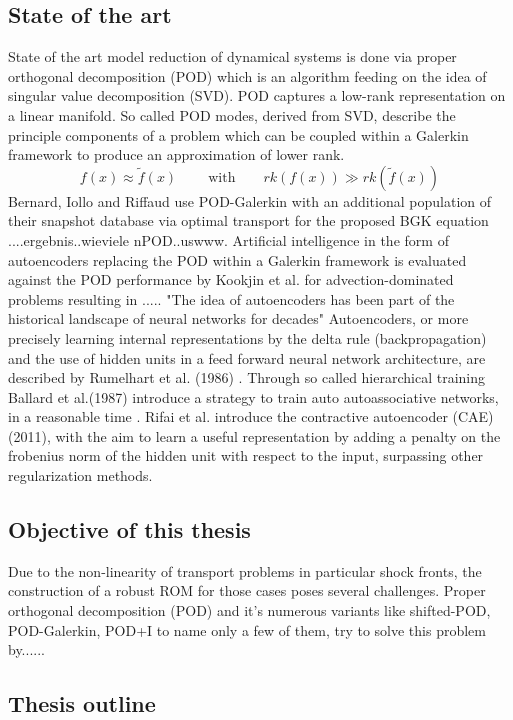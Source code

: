 \documentclass[12pt, a4paper]{article}
\begin{document}
\subsection{State of the art}
State of the art model reduction of dynamical systems is done via proper orthogonal decomposition (POD) which is an algorithm feeding on the idea of singular value decomposition (SVD)\cite{Franz}\cite{Kutz}. POD captures a low-rank representation on a linear manifold. So called POD modes, derived from SVD, describe the principle components of a problem which can be coupled within a Galerkin framework to produce an approximation of lower rank. 
\begin{equation}
	f(x)\approx \tilde{f}(x) \qquad\ \textrm{with}\qquad rk(f(x)) \gg rk(\tilde{f}(x))
\end{equation}
Bernard, Iollo and Riffaud use POD-Galerkin with an additional population of their snapshot database via optimal transport for the proposed BGK equation \cite{Bernard}....ergebnis..wieviele nPOD..uswww. Artificial intelligence in the form of autoencoders replacing the POD within a Galerkin framework is evaluated against the POD performance by Kookjin et al. for advection-dominated problems\cite{Carlberg} resulting in ..... "The idea of autoencoders has been part of the historical landscape of neural networks for decades"\cite[p.493]{Goodfellow} Autoencoders, or more precisely learning internal representations by the delta rule (backpropagation) and the use of hidden units in a feed forward neural network architecture, are described by Rumelhart et al. (1986) \cite{Rumelhart}. Through so called hierarchical training Ballard et al.(1987) introduce a strategy to train auto autoassociative networks, in a reasonable time \cite{Ballard}. Rifai et al. introduce the contractive autoencoder (CAE) (2011), with the aim to learn a useful representation by adding a penalty on the frobenius norm of the hidden unit with respect to the input, surpassing other regularization methods\cite{Rifai2011}. 
\subsection{Objective of this thesis}
Due to the non-linearity of transport problems in particular shock fronts, the construction of a robust ROM for those cases poses several challenges. Proper orthogonal decomposition (POD) and it's numerous variants like shifted-POD\cite{bibid}, POD-Galerkin\cite{bibid}, POD+I \cite{bibid} to name only a few of them, try to solve this problem by......
\subsection{Thesis outline}
\end{document}
